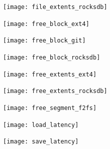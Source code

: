 \begin{figure}[t]
    \centering
	\texttt{[image: file\_extents\_rocksdb]}
	\caption{}
	\label{f:}
\end{figure}

\begin{figure}[t]
    \centering
	\texttt{[image: free\_block\_ext4]}
	\caption{}
	\label{f:}
\end{figure}

\begin{figure}[t]
    \centering
	\texttt{[image: free\_block\_git]}
	\caption{}
	\label{f:}
\end{figure}

\begin{figure}[t]
    \centering
	\texttt{[image: free\_block\_rocksdb]}
	\caption{}
	\label{f:}
\end{figure}

\begin{figure}[t]
    \centering
	\texttt{[image: free\_extents\_ext4]}
	\caption{}
	\label{f:}
\end{figure}

\begin{figure}[t]
    \centering
	\texttt{[image: free\_extents\_rocksdb]}
	\caption{}
	\label{f:}
\end{figure}

\begin{figure}[t]
    \centering
	\texttt{[image: free\_segment\_f2fs]}
	\caption{}
	\label{f:}
\end{figure}

\begin{figure}[t]
    \centering
	\texttt{[image: load\_latency]}
	\caption{}
	\label{f:}
\end{figure}

\begin{figure}[t]
    \centering
	\texttt{[image: save\_latency]}
	\caption{}
	\label{f:}
\end{figure}
